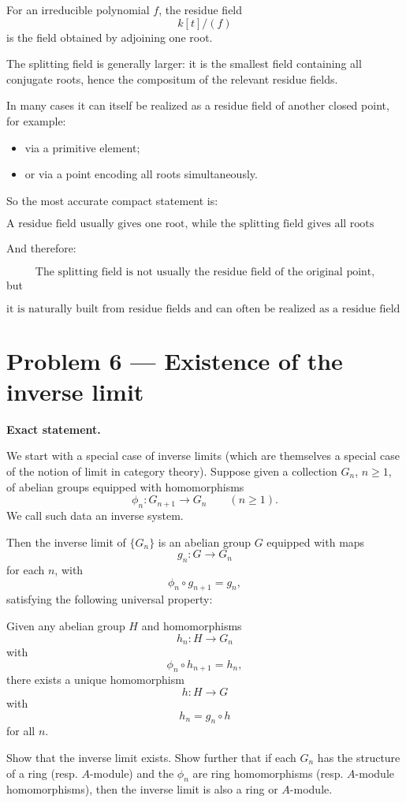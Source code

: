 \documentclass[12pt,a4paper]{article}
\theoremstyle{plain}
\theoremstyle{definition}      %
\begin{document}
For an irreducible polynomial \(f\), the residue field
\[
k[t]/(f)
\]
is the field obtained by adjoining one root.

The splitting field is generally larger: it is the smallest field containing all conjugate roots, hence the compositum of the relevant residue fields.

In many cases it can itself be realized as a residue field of another closed point, for example:
\begin{itemize}
	\item via a primitive element;
	\item or via a point encoding all roots simultaneously.
\end{itemize}

So the most accurate compact statement is:

\[
\boxed{
	\text{A residue field usually gives one root, while the splitting field gives all roots together.}
}
\]

And therefore:

\[
\boxed{
	\text{The splitting field is not usually the residue field of the original point,}
}
\]
but

\[
\boxed{
	\text{it is naturally built from residue fields and can often be realized as a residue field in a larger or different affine setting.}
}
\]	
	
	
\section*{Problem 6 --- Existence of the inverse limit}

\textbf{Exact statement.}

We start with a special case of inverse limits (which are themselves a special case of the notion of limit in category theory). Suppose given a collection \(G_n\), \(n\ge 1\), of abelian groups equipped with homomorphisms
\[
\phi_n:G_{n+1}\to G_n
\qquad (n\ge 1).
\]
We call such data an inverse system.

Then the inverse limit of \(\{G_n\}\) is an abelian group \(G\) equipped with maps
\[
g_n:G\to G_n
\]
for each \(n\), with
\[
\phi_n\circ g_{n+1}=g_n,
\]
satisfying the following universal property:

Given any abelian group \(H\) and homomorphisms
\[
h_n:H\to G_n
\]
with
\[
\phi_n\circ h_{n+1}=h_n,
\]
there exists a unique homomorphism
\[
h:H\to G
\]
with
\[
h_n=g_n\circ h
\]
for all \(n\).

Show that the inverse limit exists. Show further that if each \(G_n\) has the structure of a ring (resp. \(A\)-module) and the \(\phi_n\) are ring homomorphisms (resp. \(A\)-module homomorphisms), then the inverse limit is also a ring or \(A\)-module.
\end{document}
